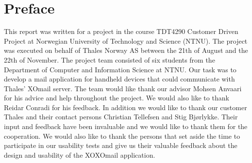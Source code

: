 \chapter*{Preface}

This report was written for a project in the course TDT4290 Customer Driven Project at Norwegian University of Technology and Science (NTNU). The project was executed on behalf of Thales Norway AS between the 21th of August and the 22th of November.
\newline
\newline
The project team consisted of six students from the Department of Computer and Information Science at NTNU. Our task was to develop a mail application for handheld devices that could communicate with Thales' XOmail server.
\newline
\newline
The team would like thank our advisor Mohsen Anvaari for his advice and help throughout the project. We would also like to thank Reidar Conradi for his feedback. 
\newline
\newline
In addition we would like to thank our customer Thales and their contact persons Christian Tellefsen and Stig Bjørlykke. Their input and feedback have been invaluable and we would like to thank them for the cooperation. 
\newline
\newline
We would also like to thank the persons that set aside the time to participate in our usability tests and give us their valuable feedback about the design and usability of the XOXOmail application.
